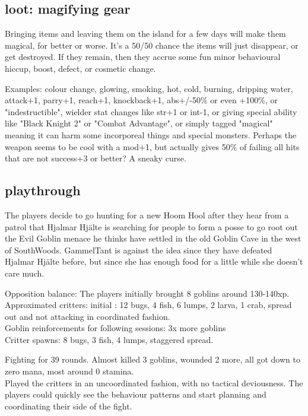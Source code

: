 \flushbottom


\subsection*{loot: magifying gear}
Bringing items and leaving them on the island for a few days will make them magical, for better or worse. It's a 50/50 chance the items will just disappear, or get destroyed. If they remain, then they accrue some fun minor behavioural hiccup, boost, defect, or cosmetic change.

Examples: colour change, glowing, smoking, hot, cold, burning, dripping water, attack+1, parry+1, reach+1, knockback+1, abs+/-50\% or even +100\%, or "indestructible", wielder stat changes like str+1 or int-1, or giving special ability like "Black Knight 2" or "Combat Advantage", or simply tagged "magical" meaning it can harm some incorporeal things and special monsters.
Perhaps the weapon seems to be cool with a mod+1, but actually gives 50\% of failing all hits that are not success+3 or better? A sneaky curse.


\subsection*{playthrough}
The players decide to go hunting for a new Hoom Hool after they hear from a patrol that Hjalmar Hjälte is searching for people to form a posse to go root out the Evil Goblin menace he thinks have settled in the old Goblin Cave in the west of SouthWoods. GammelTant is against the idea since they have defeated Hjalmar Hjälte before, but since she has enough food for a little while she doesn't care much.

Opposition balance: The players initially brought 8 goblins around 130-140xp.\\ Approximated critters: initial : 12 bugs, 4 fish, 6 lumps, 2 larva, 1 crab, spread out and not attacking in coordinated fashion.\\
Goblin reinforcements for following sessions: 3x more goblins\\
Critter spawns: 8 bugs, 3 fish, 4 lumps, staggered spread.

Fighting for 39 rounds. Almost killed 3 goblins, wounded 2 more, all got down to zero mana, most around 0 stamina.\\
Played the critters in an uncoordinated fashion, with no tactical deviousness. The players could quickly see the behaviour patterns and start planning and coordinating their side of the fight.

